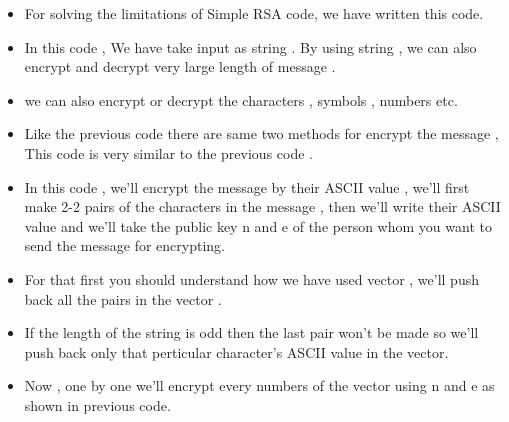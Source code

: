 \documentclass{article}
\begin{document}
\begin{tcolorbox}

\begin{itemize}
\item  For solving the limitations of Simple RSA code, we have written this code.
\end{itemize}

\begin{itemize}
\item In this code , We have take input as string . By using string , we can also encrypt and decrypt very large length of message .
\end{itemize}

\begin{itemize}
\item we can also encrypt or decrypt the characters , symbols , numbers etc.
\end{itemize}

\begin{itemize}
\item Like the previous code there are same two methods for encrypt the message , This code is very similar to the previous code .
\end{itemize}

\begin{itemize}
\item In this code , we'll encrypt the message by their ASCII value , we'll first make 2-2 pairs of the characters in the message , then we'll write their ASCII value and we'll take the public key n and e of the person whom you want to send the message for encrypting. 
\end{itemize}
\begin{itemize}
\item For that first you should understand how we have used vector , we'll push back all the pairs in the vector .
\end{itemize}

\begin{itemize}
\item If the length of the string is odd then the last pair won't be made so  we'll push back only that perticular character's ASCII value in the vector.
\end{itemize}

\begin{itemize}
\item Now , one by one we'll encrypt every numbers of the vector using n and e as shown in previous code.
\end{itemize}


\end{tcolorbox}
\end{document}
